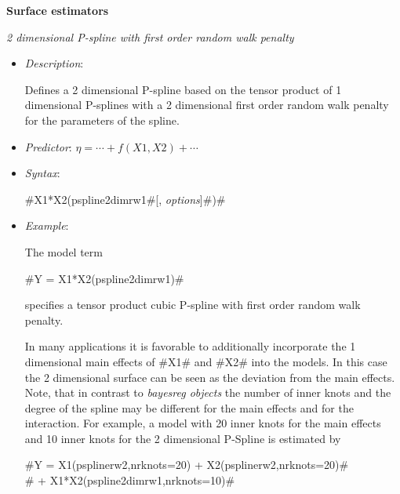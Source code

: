{\bf Surface estimators}
\medskip

{\em 2 dimensional P-spline with first order random walk penalty}
\begin{itemize}
\item[] {\em Description}:

Defines a 2 dimensional P-spline based on the tensor product of 1
dimensional P-splines with a 2 dimensional first order random walk
penalty for the parameters of the spline.
\item[] {\em Predictor}: $\eta= \cdots + f(X1,X2) + \cdots$
\item[] {\em Syntax}:

#X1*X2(pspline2dimrw1#[, {\em options}]#)#
\item[] {\em Example}:

The model term

#Y = X1*X2(pspline2dimrw1)#

specifies a tensor product cubic P-spline with first order random
walk penalty.

In many applications it is favorable to additionally incorporate
the 1 dimensional main effects of #X1# and #X2# into the models. In
this case the 2 dimensional surface can be seen as the deviation
from the main effects. Note, that in contrast to {\em bayesreg
objects} the number of inner knots and the degree of the spline
may be different for the main effects and for the interaction. For
example, a model with 20 inner knots for the main effects and 10
inner knots for the 2 dimensional P-Spline is estimated by

 #Y = X1(psplinerw2,nrknots=20) + X2(psplinerw2,nrknots=20)#\\
 #    + X1*X2(pspline2dimrw1,nrknots=10)#
\end{itemize}

